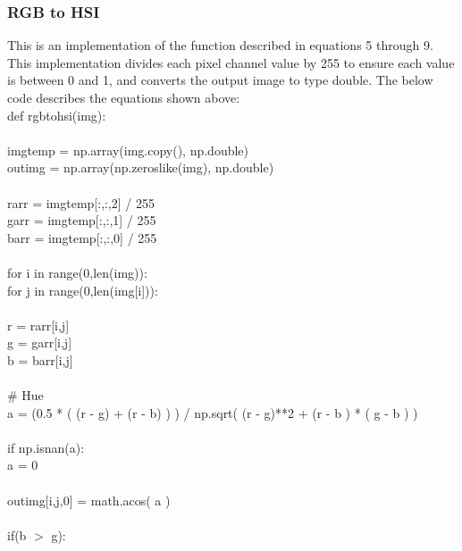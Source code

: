 \documentclass{article}
\begin{document}
	\subsubsection{RGB to HSI}
	
	This is an implementation of the function described in equations 5 through 9. This implementation divides each pixel channel value by 255 to ensure each value is between 0 and 1, and converts the output image to type double. The below code describes the equations shown above:\\
	
	\noindent def rgb\textunderscore to\textunderscore hsi(img):\\
	\\
	\indent img\textunderscore temp = np.array(img.copy(), np.double)\\
	\indent out\textunderscore img = np.array(np.zeros\textunderscore like(img), np.double)\\
	\\
	\indent r\textunderscore arr = img\textunderscore temp[:,:,2] / 255\\
	\indent g\textunderscore arr = img\textunderscore temp[:,:,1] / 255\\
	\indent b\textunderscore arr = img\textunderscore temp[:,:,0] / 255\\
	\\
	\indent for i in range(0,len(img)):\\
	\indent \indent for j in range(0,len(img[i])):\\
	\\
	\indent \indent \indent r = r\textunderscore arr[i,j]\\
	\indent \indent \indent g = g\textunderscore arr[i,j]\\
	\indent \indent \indent	b = b\textunderscore arr[i,j]\\
	\\
	\indent \indent \indent \# Hue\\
	\indent \indent \indent a = (0.5 * ( (r - g) + (r - b) ) ) / np.sqrt( (r - g)**2 + (r - b ) * ( g - b ) )\\
	\\
	\indent \indent \indent if np.isnan(a):\\
	\indent \indent \indent \indent a = 0\\
	\\
	\indent \indent \indent out\textunderscore img[i,j,0] = math.acos( a )\\
	\\
	\indent \indent \indent if(b $>$ g):\\
\end{document}
